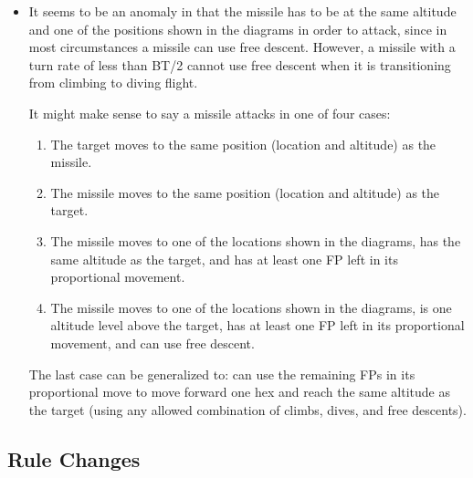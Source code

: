 \documentclass[10pt]{article}
\begin{document}
\begin{itemize}
\item It seems to be an anomaly in that the missile has to be at the same altitude and one of the positions shown in the diagrams in order to attack, since in most circumstances a missile can use free descent. However, a missile with a turn rate of less than BT/2 cannot use free descent when it is transitioning from climbing to diving flight. 

It might make sense to say a missile attacks in one of four cases:
\begin{enumerate}
    \item The target moves to the same position (location and altitude) as the missile.
    \item The missile moves to the same position (location and altitude) as the target.
    \item The missile moves to one of the locations shown in the diagrams, has the same altitude as the target, and has at least one FP left in its proportional movement.
    \item The missile moves to one of the locations shown in the diagrams, is one altitude level above the target, has at least one FP left in its proportional movement, and can use free descent.
\end{enumerate}
The last case can be generalized to: can use the remaining FPs in its proportional move to move forward one hex and reach the same altitude as the target (using any allowed combination of climbs, dives, and free descents).

\end{itemize}

\subsection{Rule Changes}
\end{document}
